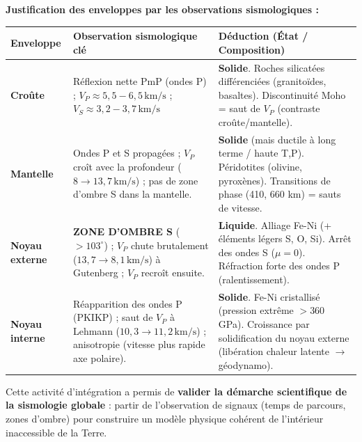 \documentclass[11pt]{article}
\newcounter{popsec}
\newcounter{popsub}
\newcommand{\courssub}[1]{%
  \stepcounter{popsub}%
  \par\vspace{9pt}\noindent{\popxbold\fontsize{11.5}{13}\selectfont\color{popink}{\color{poporange}\thepopsec.\thepopsub}\hspace{6pt}#1}\par\nopagebreak\vspace{4pt}
}
\begin{document}
\begin{exoresolu}
\par
\textbf{Justification des enveloppes par les observations sismologiques :}
\begin{center}
\begin{tabularx}{\linewidth}{|l|X|X|}\hline
\textbf{Enveloppe} & \textbf{Observation sismologique clé} & \textbf{Déduction (État / Composition)} \\ \hline
\textbf{Croûte} & Réflexion nette PmP (ondes P) ; $V_P \approx 5,5-6,5\,\text{km/s}$ ; $V_S \approx 3,2-3,7\,\text{km/s}$ & \textbf{Solide}. Roches silicatées différenciées (granitoïdes, basaltes). Discontinuité Moho = saut de $V_P$ (contraste croûte/mantelle). \\ \hline
\textbf{Mantelle} & Ondes P et S propagées ; $V_P$ croît avec la profondeur ($8 \to 13,7\,\text{km/s}$) ; pas de zone d'ombre S dans la mantelle. & \textbf{Solide} (mais ductile à long terme / haute T,P). Péridotites (olivine, pyroxènes). Transitions de phase (410, 660 km) = sauts de vitesse. \\ \hline
\textbf{Noyau externe} & \textbf{ZONE D'OMBRE S} ($>103^\circ$) ; $V_P$ chute brutalement ($13,7 \to 8,1\,\text{km/s}$) à Gutenberg ; $V_P$ recroît ensuite. & \textbf{Liquide}. Alliage Fe-Ni (+ éléments légers S, O, Si). Arrêt des ondes S ($\mu=0$). Réfraction forte des ondes P (ralentissement). \\ \hline
\textbf{Noyau interne} & Réapparition des ondes P (PKIKP) ; saut de $V_P$ à Lehmann ($10,3 \to 11,2\,\text{km/s}$) ; anisotropie (vitesse plus rapide axe polaire). & \textbf{Solide}. Fe-Ni cristallisé (pression extrême $> 360$ GPa). Croissance par solidification du noyau externe (libération chaleur latente $\to$ géodynamo). \\ \hline
\end{tabularx}
\end{center}
\end{exoresolu}

\courssub{Bilan de l'activité}
Cette activité d'intégration a permis de \textbf{valider la démarche scientifique de la sismologie globale} : partir de l'observation de signaux (temps de parcours, zones d'ombre) pour construire un modèle physique cohérent de l'intérieur inaccessible de la Terre.
\end{document}
